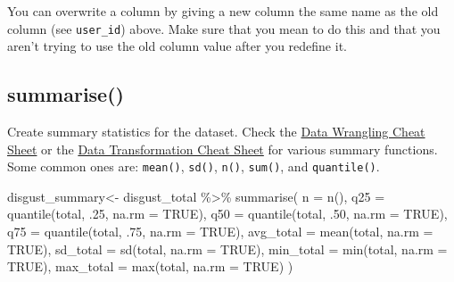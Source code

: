 \documentclass[
  oneside]{book}
\newenvironment{Shaded}{\begin{snugshade}}{\end{snugshade}}
\newcommand{\AttributeTok}[1]{\textcolor[rgb]{0.77,0.63,0.00}{#1}}
\newcommand{\ConstantTok}[1]{\textcolor[rgb]{0.00,0.00,0.00}{#1}}
\newcommand{\DecValTok}[1]{\textcolor[rgb]{0.00,0.00,0.81}{#1}}
\newcommand{\FunctionTok}[1]{\textcolor[rgb]{0.00,0.00,0.00}{#1}}
\newcommand{\NormalTok}[1]{#1}
\newcommand{\OtherTok}[1]{\textcolor[rgb]{0.56,0.35,0.01}{#1}}
\newcommand{\SpecialCharTok}[1]{\textcolor[rgb]{0.00,0.00,0.00}{#1}}
\begin{document}
\begin{warning}
You can overwrite a column by giving a new column the same name as the old column (see \texttt{user\_id}) above. Make sure that you mean to do this and that you aren't trying to use the old column value after you redefine it.

\end{warning}

\hypertarget{summarise}{%
\subsection{summarise()}\label{summarise}}

Create summary statistics for the dataset. Check the \href{https://www.rstudio.org/links/data_wrangling_cheat_sheet}{Data Wrangling Cheat Sheet} or the \href{https://github.com/rstudio/cheatsheets/raw/master/source/pdfs/data-transformation-cheatsheet.pdf}{Data Transformation Cheat Sheet} for various summary functions. Some common ones are: \texttt{mean()}, \texttt{sd()}, \texttt{n()}, \texttt{sum()}, and \texttt{quantile()}.

\begin{Shaded}
\begin{Highlighting}[]
\NormalTok{disgust\_summary}\OtherTok{\textless{}{-}}\NormalTok{ disgust\_total }\SpecialCharTok{\%\textgreater{}\%}
  \FunctionTok{summarise}\NormalTok{(}
    \AttributeTok{n =} \FunctionTok{n}\NormalTok{(),}
    \AttributeTok{q25 =} \FunctionTok{quantile}\NormalTok{(total, .}\DecValTok{25}\NormalTok{, }\AttributeTok{na.rm =} \ConstantTok{TRUE}\NormalTok{),}
    \AttributeTok{q50 =} \FunctionTok{quantile}\NormalTok{(total, .}\DecValTok{50}\NormalTok{, }\AttributeTok{na.rm =} \ConstantTok{TRUE}\NormalTok{),}
    \AttributeTok{q75 =} \FunctionTok{quantile}\NormalTok{(total, .}\DecValTok{75}\NormalTok{, }\AttributeTok{na.rm =} \ConstantTok{TRUE}\NormalTok{),}
    \AttributeTok{avg\_total =} \FunctionTok{mean}\NormalTok{(total, }\AttributeTok{na.rm =} \ConstantTok{TRUE}\NormalTok{),}
    \AttributeTok{sd\_total  =} \FunctionTok{sd}\NormalTok{(total, }\AttributeTok{na.rm =} \ConstantTok{TRUE}\NormalTok{),}
    \AttributeTok{min\_total =} \FunctionTok{min}\NormalTok{(total, }\AttributeTok{na.rm =} \ConstantTok{TRUE}\NormalTok{),}
    \AttributeTok{max\_total =} \FunctionTok{max}\NormalTok{(total, }\AttributeTok{na.rm =} \ConstantTok{TRUE}\NormalTok{)}
\NormalTok{  )}
\end{Highlighting}
\end{Shaded}
\end{document}
